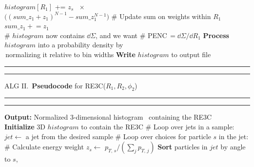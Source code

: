\begin{table}
\begin{minipage}{0.58\textwidth}
\begin{algorithmic}[1]
                \State
                $histogram[R_1]$
                +=
                $z_s
                \,\,\,\,
                \times $
                \\
                \qquad\qquad\qquad\quad
                $\bigl(
                    (
                        sum\_z_1 + z_1
                    )^{N-1}
                    -
                    sum\_z_1^{N-1}
                \bigr)
                $
                \State
                \textcolor{codegreen!80!black}{\# Update sum on weights within \(R_1\)}
                \State
                $sum\_z_1 +\!\!= z_1$
            \EndFor
        \EndFor
    \EndFor
    \\
    \State \textcolor{codegreen!80!black}{\# $histogram$ now contains $\dd\Sigma$, and we want}
    \State \textcolor{codegreen!80!black}{\# PENC$\,=\dd \Sigma/\dd R_1$}
    \State \textbf{Process} $histogram$ into a probability density by
    \\
    \qquad\qquad\,normalizing it relative to bin widths
    \State \textbf{Write} $histogram$ to output file
\end{algorithmic}
\vspace{5pt}
\hrule height 1.3pt
\end{minipage}
%
\hspace{10pt}
\vline
\hspace{10pt}
%
\begin{minipage}{0.58\textwidth}
\hrule height 1.3pt
\vspace{4pt}
{
    \hypertarget{alg:re3c}{ALG II.}\, %
    \textbf{Pseudocode} for RE3C($R_1,R_2,\phi_2$)
}
\vspace{4pt}
\hrule
\hrule
\vspace{5pt}
\begin{algorithmic}[1]
    \State \textbf{Output:} Normalized 3-dimensional histogram
    \State \qquad\qquad\,{}
    containing the RE3C
    \\
    \State
    \textbf{Initialize} 3D $histogram$ to contain the RE3C
    \State \textcolor{codegreen!80!black}{\# Loop over jets in a sample:}
        \State $jet \gets$ a jet from the desired sample
        \State \textcolor{codegreen!80!black}{\# Loop over choices for particle $s$ in the jet:}
            \State \textcolor{codegreen!80!black}{\# Calculate energy weight}
            \State $z_s \gets $ \(p_{T,\, s}/(\sum_j p_{T,\,j})\)
            \State \textbf{Sort} particles in $jet$ by angle to $s$,

\end{algorithmic}
\end{minipage}
\end{table}
